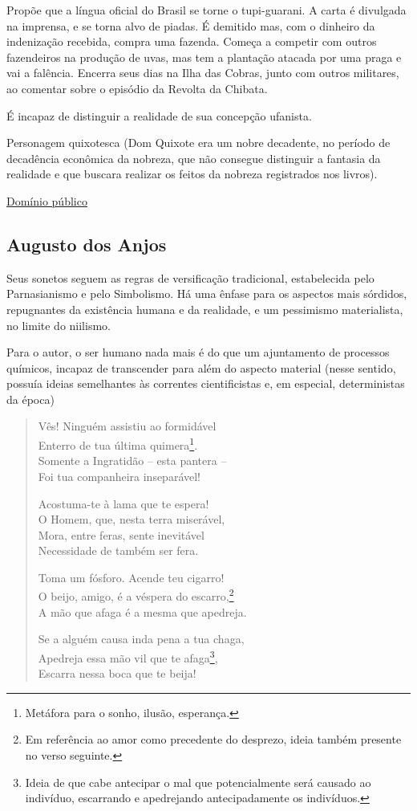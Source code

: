 Propõe que a língua oficial do Brasil se torne o tupi-guarani. A carta é divulgada na imprensa, e se torna alvo de piadas. É demitido mas, com o dinheiro da indenização recebida, compra uma fazenda. Começa a competir com outros fazendeiros na produção de uvas, mas tem a plantação atacada por uma praga e vai a falência. Encerra seus dias na Ilha das Cobras, junto com outros militares, ao comentar sobre o episódio da Revolta da Chibata.

É incapaz de distinguir a realidade de sua concepção ufanista.

Personagem quixotesca (Dom Quixote era um nobre decadente, no período de decadência econômica da nobreza, que não consegue distinguir a fantasia da realidade e que buscara realizar os feitos da nobreza registrados nos livros).

\href{http://www.dominiopublico.gov.br/download/texto/bn000013.pdf}{Domínio público}

\subsection{Augusto dos Anjos}

Seus sonetos seguem as regras de versificação tradicional, estabelecida pelo Parnasianismo e pelo Simbolismo. Há uma ênfase para os aspectos mais sórdidos, repugnantes da existência humana e da realidade, e um pessimismo materialista, no limite do niilismo.

Para o autor, o ser humano nada mais é do que um ajuntamento de processos químicos, incapaz de transcender para além do aspecto material (nesse sentido, possuía ideias semelhantes às correntes cientificistas e, em especial, deterministas da época)

\begin{verse}
Vês! Ninguém assistiu ao formidável \\
Enterro de tua última quimera\footnote{Metáfora para o sonho, ilusão, esperança.}. \\
Somente a Ingratidão -- esta pantera -- \\
Foi tua companheira inseparável!

Acostuma-te à lama que te espera!  \\
O Homem, que, nesta terra miserável, \\
Mora, entre feras, sente inevitável \\
Necessidade de também ser fera.

Toma um fósforo. Acende teu cigarro! \\
O beijo, amigo, é a véspera do escarro,\footnote{Em referência ao amor como precedente do desprezo, ideia também presente no verso seguinte.} \\
A mão que afaga é a mesma que apedreja.

Se a alguém causa inda pena a tua chaga, \\
Apedreja essa mão vil que te afaga\footnote{Ideia de que cabe antecipar o mal que potencialmente será causado ao indivíduo, escarrando e apedrejando antecipadamente os indivíduos.}, \\
Escarra nessa boca que te beija! 
\end{verse}

